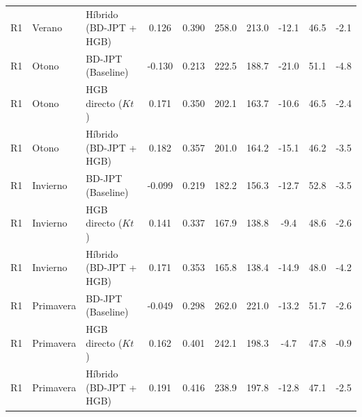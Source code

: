 \documentclass[../main.tex]{subfiles}
\begin{document}
\begin{table}[!ht]
{\begin{tabular}{l l l c c c c c c c}
R1 & Verano & Híbrido (BD-JPT + HGB) & 0.126 & 0.390 & 258.0 & 213.0 & -12.1 & 46.5 & -2.1 \\
R1 & Otono & BD-JPT (Baseline) & -0.130 & 0.213 & 222.5 & 188.7 & -21.0 & 51.1 & -4.8 \\
R1 & Otono & HGB directo ($Kt$) & 0.171 & 0.350 & 202.1 & 163.7 & -10.6 & 46.5 & -2.4 \\
R1 & Otono & Híbrido (BD-JPT + HGB) & 0.182 & 0.357 & 201.0 & 164.2 & -15.1 & 46.2 & -3.5 \\
R1 & Invierno & BD-JPT (Baseline) & -0.099 & 0.219 & 182.2 & 156.3 & -12.7 & 52.8 & -3.5 \\
R1 & Invierno & HGB directo ($Kt$) & 0.141 & 0.337 & 167.9 & 138.8 & -9.4 & 48.6 & -2.6 \\
R1 & Invierno & Híbrido (BD-JPT + HGB) & 0.171 & 0.353 & 165.8 & 138.4 & -14.9 & 48.0 & -4.2 \\
R1 & Primavera & BD-JPT (Baseline) & -0.049 & 0.298 & 262.0 & 221.0 & -13.2 & 51.7 & -2.6 \\
R1 & Primavera & HGB directo ($Kt$) & 0.162 & 0.401 & 242.1 & 198.3 & -4.7 & 47.8 & -0.9 \\
R1 & Primavera & Híbrido (BD-JPT + HGB) & 0.191 & 0.416 & 238.9 & 197.8 & -12.8 & 47.1 & -2.5 \\
\bottomrule
\end{tabular}
}
\end{table}

\newpage
\end{document}
